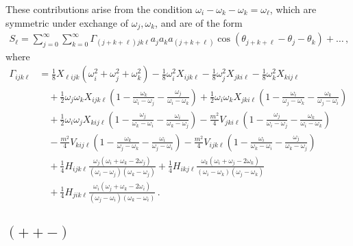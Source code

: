 \documentclass[letterpaper,11pt]{article}
\newcommand{\oi}{\omega_i}
\newcommand{\oj}{\omega_j}
\newcommand{\ok}{\omega_k}
\newcommand{\ol}{\omega_\ell}
\newcommand{\thj}{\theta_j}
\newcommand{\thk}{\theta_k}
\begin{document}
These contributions arise from the condition $\oi - \ok - \ok = \ol$, which are symmetric under exchange of $\oj, \ok$, and are of the form
\begin{align}
S_\ell = \sum_{j=0}^\infty \sum_{k=0}^\infty \Gamma_{(j+k+\ell) jk\ell} a_j a_k a_{(j+k+\ell)} \cos \left( \theta_{j+k+\ell} - \thj - \thk \right) + \ldots \, ,
\end{align}
where
\begin{align}
\Gamma_{ijk\ell} &=\frac{1}{8} X_{\ell ijk} \left( \oi^2 + \oj^2 + \ok^2 \right) - \frac{1}{8} \oi^2 X_{ijk\ell} - \frac{1}{8} \oj^2 X_{jki\ell} - \frac{1}{8} \ok^2 X_{kij\ell} \nonumber \\
%
& \quad + \frac{1}{2} \oj \ok X_{ijk\ell} \left( 1 - \frac{\ok}{\oi - \oj} - \frac{\oj}{\oi - \ok} \right) + \frac{1}{2} \oi \ok X_{jki\ell} \left( 1 - \frac{\oi}{\oj - \ok} - \frac{\ok}{\oj-\oi} \right) \nonumber \\
%
& \quad + \frac{1}{2} \oi \oj X_{kij\ell} \left( 1 - \frac{\oj}{\ok - \oi} - \frac{\oi}{\ok - \oj} \right) - \frac{m^2}{4} V_{jki\ell} \left(1 - \frac{\oj}{\oi - \oj} - \frac{\ok}{\oi - \ok} \right) \nonumber \\
%
& \quad - \frac{m^2}{4} V_{kij\ell} \left( 1 - \frac{\ok}{\oj - \ok} - \frac{\oi}{\oj - \oi} \right) - \frac{m^2}{4} V_{ijk\ell} \left( 1 - \frac{\oi}{\ok - \oi} - \frac{\oj}{\ok - \oj} \right) \nonumber \\
%
& \quad + \frac{1}{4} H_{ijk\ell} \frac{\oj (\oi + \ok - 2\oj)}{(\oi - \oj)(\ok - \oj)} + \frac{1}{4} H_{ikj\ell} \frac{\ok (\oi + \oj - 2\ok)}{(\oi - \ok)(\oj - \ok)} \nonumber \\
%
& \quad + \frac{1}{4} H_{jik\ell} \frac{\oi (\oj + \ok - 2\oi)}{(\oj - \oi)(\ok - \oi)} \, .
\end{align}


\subsection{$(++-)$}
\end{document}
